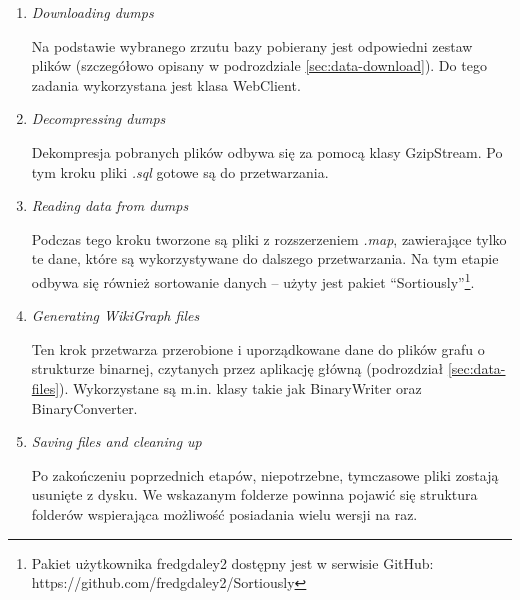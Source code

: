 \begin{enumerate}[label=\textbullet]
    \item \textit{Downloading dumps}

    Na podstawie wybranego zrzutu bazy pobierany jest odpowiedni zestaw plików (szczegółowo opisany w podrozdziale \ref{sec:data-download}). Do tego zadania wykorzystana jest klasa WebClient.

    \item \textit{Decompressing dumps}

    Dekompresja pobranych plików odbywa się za pomocą klasy GzipStream. Po tym kroku pliki \textit{.sql} gotowe są do przetwarzania.

    \item \textit{Reading data from dumps}

    Podczas tego kroku tworzone są pliki z rozszerzeniem \textit{.map}, zawierające tylko te dane, które są wykorzystywane do dalszego przetwarzania. Na tym etapie odbywa się również sortowanie danych – użyty jest pakiet ``Sortiously''\footnote{Pakiet użytkownika fredgdaley2 dostępny jest w serwisie GitHub: https://github.com/fredgdaley2/Sortiously}.

    \item \textit{Generating WikiGraph files}

    Ten krok przetwarza przerobione i uporządkowane dane do plików grafu o strukturze binarnej, czytanych przez aplikację główną (podrozdział \ref{sec:data-files}). Wykorzystane są m.in. klasy takie jak BinaryWriter oraz BinaryConverter.

    \item \textit{Saving files and cleaning up}	

    Po zakończeniu poprzednich etapów, niepotrzebne, tymczasowe pliki zostają usunięte z dysku. We wskazanym folderze powinna pojawić się struktura folderów wspierająca możliwość posiadania wielu wersji na raz.

\end{enumerate}